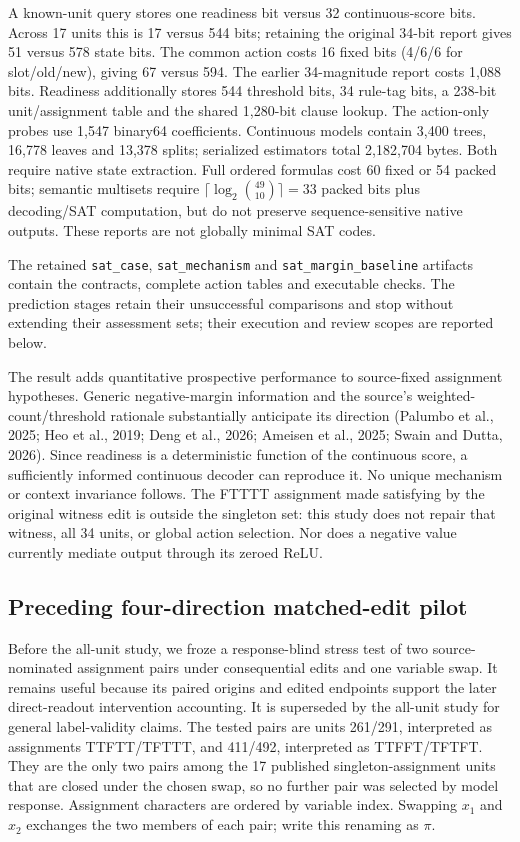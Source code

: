 \documentclass[
  british,
  11pt,
  a4paper,
]{article}
\begin{document}
A known-unit query stores one readiness bit versus 32 continuous-score
bits. Across 17 units this is 17 versus 544 bits; retaining the original
34-bit report gives 51 versus 578 state bits. The common action costs 16
fixed bits (4/6/6 for slot/old/new), giving 67 versus 594. The earlier
34-magnitude report costs 1,088 bits. Readiness additionally stores 544
threshold bits, 34 rule-tag bits, a 238-bit unit/assignment table and
the shared 1,280-bit clause lookup. The action-only probes use 1,547
binary64 coefficients. Continuous models contain 3,400 trees, 16,778
leaves and 13,378 splits; serialized estimators total 2,182,704 bytes.
Both require native state extraction. Full ordered formulas cost 60
fixed or 54 packed bits; semantic multisets require
\(\lceil\log_2\binom{49}{10}\rceil=33\) packed bits plus decoding/SAT
computation, but do not preserve sequence-sensitive native outputs.
These reports are not globally minimal SAT codes.

The retained \texttt{sat\_case}, \texttt{sat\_mechanism} and
\texttt{sat\_margin\_baseline} artifacts contain the contracts, complete
action tables and executable checks. The prediction stages retain their
unsuccessful comparisons and stop without extending their assessment
sets; their execution and review scopes are reported below.

The result adds quantitative prospective performance to source-fixed
assignment hypotheses. Generic negative-margin information and the
source's weighted-count/threshold rationale substantially anticipate its
direction (Palumbo et al., 2025; Heo et al., 2019; Deng et al., 2026;
Ameisen et al., 2025; Swain and Dutta, 2026). Since readiness is a
deterministic function of the continuous score, a sufficiently informed
continuous decoder can reproduce it. No unique mechanism or context
invariance follows. The FTTTT assignment made satisfying by the original
witness edit is outside the singleton set: this study does not repair
that witness, all 34 units, or global action selection. Nor does a
negative value currently mediate output through its zeroed ReLU.

\subsection{Preceding four-direction matched-edit
pilot}\label{preceding-four-direction-matched-edit-pilot}

Before the all-unit study, we froze a response-blind stress test of two
source-nominated assignment pairs under consequential edits and one
variable swap. It remains useful because its paired origins and edited
endpoints support the later direct-readout intervention accounting. It
is superseded by the all-unit study for general label-validity claims.
The tested pairs are units 261/291, interpreted as assignments
TTFTT/TFTTT, and 411/492, interpreted as TTFFT/TFTFT. They are the only
two pairs among the 17 published singleton-assignment units that are
closed under the chosen swap, so no further pair was selected by model
response. Assignment characters are ordered by variable index. Swapping
\(x_1\) and \(x_2\) exchanges the two members of each pair; write this
renaming as \(\pi\).
\end{document}

